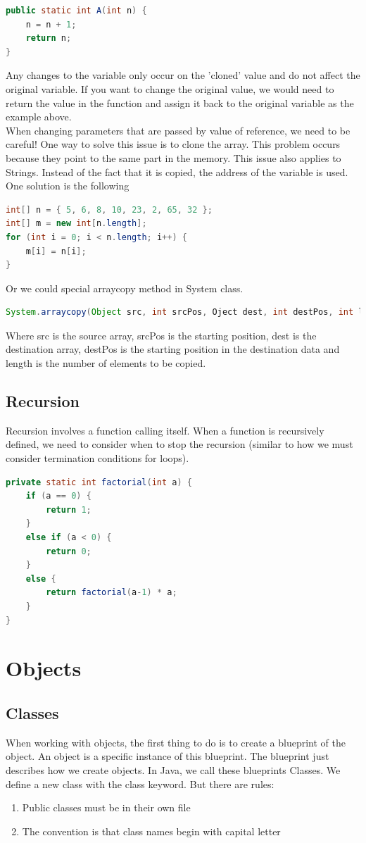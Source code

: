 \documentclass[11pt,a4 paper]{book}
\theoremstyle{plain}
\theoremstyle{definition}
\theoremstyle{remark}
\begin{document}
\begin{flushleft}
\begin{lstlisting}[language = Java]
public static int A(int n) {
	n = n + 1;
	return n;
}
\end{lstlisting}
Any changes to the variable only occur on the 'cloned' value and do not affect the original variable. If you want to change the original value, we would need to return the value in the function and assign it back to the original variable as the example above. \\
When changing parameters that are passed by value of reference, we need to be careful! One way to solve this issue is to clone the array. This problem occurs because they point to the same part in the memory. This issue also applies to Strings. Instead of the fact that it is copied, the address of the variable is used. One solution is the following
\begin{lstlisting}[language = Java]
int[] n = { 5, 6, 8, 10, 23, 2, 65, 32 };
int[] m = new int[n.length];
for (int i = 0; i < n.length; i++) {
	m[i] = n[i];
}
\end{lstlisting}
Or we could special arraycopy method in System class.
\begin{lstlisting}[language = Java]
System.arraycopy(Object src, int srcPos, Oject dest, int destPos, int length)
\end{lstlisting}
Where src is the source array, srcPos is the starting position, dest is the destination array, destPos is the starting position in the destination data and length is the number of elements to be copied.
\subsection{Recursion}
Recursion involves a function calling itself. When a function is recursively defined, we need to consider when to stop the recursion (similar to how we must consider termination conditions for loops).
\begin{lstlisting}[language = Java]
private static int factorial(int a) {
	if (a == 0) {
		return 1;
	}
	else if (a < 0) {
		return 0;
	}
	else {
		return factorial(a-1) * a;
	}
}
\end{lstlisting}
\section{Objects}
\subsection{Classes}
When working with objects, the first thing to do is to create a blueprint of the object. An object is a specific instance of this blueprint. The blueprint just describes how we create objects. In Java, we call these blueprints Classes. We define a new class with the class keyword. But there are rules:
\begin{enumerate}
	\item Public classes must be in their own file
	\item The convention is that class names begin with capital letter
\end{enumerate}

\end{flushleft}
\end{document}
